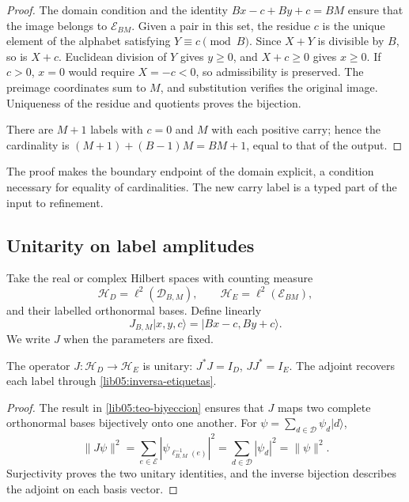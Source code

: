 \begin{proof}
The domain condition and the identity
\(Bx-c+By+c=BM\) ensure that the image belongs to
\(\mathcal E_{BM}\). Given a pair in this set, the residue
\(c\) is the unique element of the alphabet satisfying
\(Y\equiv c\pmod B\). Since \(X+Y\) is divisible by \(B\),
so is \(X+c\). Euclidean division of \(Y\) gives
\(y\geq0\), and \(X+c\geq0\) gives \(x\geq0\). If \(c>0\),
\(x=0\) would require \(X=-c<0\), so admissibility
is preserved. The preimage coordinates sum to \(M\), and
substitution verifies the original image. Uniqueness of the residue and
quotients proves the bijection.

There are \(M+1\) labels with \(c=0\) and \(M\) with each positive
carry; hence the cardinality is
\((M+1)+(B-1)M=BM+1\), equal to that of the output.
\end{proof}

The proof makes the boundary endpoint of the domain explicit, a condition
necessary for equality of cardinalities. The new carry label
is a typed part of the input to refinement.

\subsection{Unitarity on label amplitudes}
\label{lib05:unitariedad}

Take the real or complex Hilbert spaces with counting measure
\begin{equation}
 \mathscr H_D=\ell^2(\mathcal D_{B,M}),\qquad
 \mathscr H_E=\ell^2(\mathcal E_{BM}),
 \label{lib05:hilbert}
\end{equation}
and their labelled orthonormal bases. Define linearly
\begin{equation}
 J_{B,M}|x,y,c\rangle=|Bx-c,By+c\rangle.
 \label{lib05:j}
\end{equation}
We write \(J\) when the parameters are fixed.

\begin{proposition}
\label{lib05:prop-unitaria}
The operator \(J:\mathscr H_D\to\mathscr H_E\) is unitary:
\(J^*J=I_D\), \(JJ^*=I_E\). The adjoint recovers each label
through \eqref{lib05:inversa-etiquetas}.
\end{proposition}

\begin{proof}
The result in \cref{lib05:teo-biyeccion} ensures that \(J\) maps
two complete orthonormal bases bijectively onto one another. For
\(\psi=\sum_{d\in\mathcal D}\psi_d|d\rangle\),
\[
 \|J\psi\|^2
 =\sum_{e\in\mathcal E}|\psi_{\ell_{B,M}^{-1}(e)}|^2
 =\sum_{d\in\mathcal D}|\psi_d|^2=\|\psi\|^2.
\]
Surjectivity proves the two unitary identities, and the
inverse bijection describes the adjoint on each basis vector.
\end{proof}

